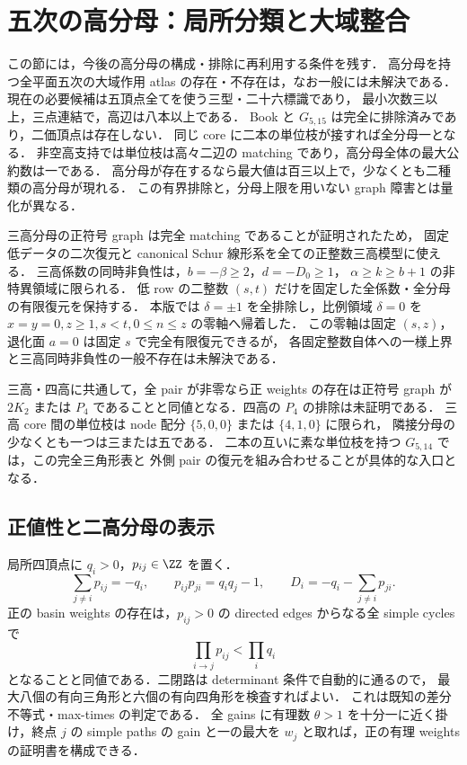 \section{五次の高分母：局所分類と大域整合}
\label{nt19:denominators}

この節には，今後の高分母の構成・排除に再利用する条件を残す．
高分母を持つ全平面五次の大域作用 atlas の存在・不存在は，なお一般には未解決である．
現在の必要候補は五頂点全てを使う三型・二十六標識であり，
最小次数三以上，三点連結で，高辺は八本以上である．
Book と $G_{5,15}$ は完全に排除済みであり，二価頂点は存在しない．
同じ core に二本の単位枝が接すれば全分母一となる．
非空高支持では単位枝は高々二辺の matching であり，高分母全体の最大公約数は一である．
高分母が存在するなら最大値は百三以上で，少なくとも二種類の高分母が現れる．
この有界排除と，分母上限を用いない graph 障害とは量化が異なる．

三高分母の正符号 graph は完全 matching であることが証明されたため，
固定低データの二次復元と canonical Schur 線形系を全ての正整数三高模型に使える．
三高係数の同時非負性は，$b=-\beta\ge2$，$d=-D_0\ge1$，
$\alpha\ge k\ge b+1$ の非特異領域に限られる．
低 row の二整数 $(s,t)$ だけを固定した全係数・全分母の有限復元を保持する．
本版では $\delta=\pm1$ を全排除し，比例領域 $\delta=0$ を
$x=y=0,z\ge1,s<t,0\le n\le z$ の零軸へ帰着した．
この零軸は固定 $(s,z)$，退化面 $a=0$ は固定 $s$ で完全有限復元できるが，
各固定整数自体への一様上界と三高同時非負性の一般不存在は未解決である．

三高・四高に共通して，全 pair が非零なら正 weights の存在は正符号 graph が
$2K_2$ または $P_4$ であることと同値となる．四高の $P_4$ の排除は未証明である．
三高 core 間の単位枝は node 配分 $\{5,0,0\}$ または $\{4,1,0\}$ に限られ，
隣接分母の少なくとも一つは三または五である．
二本の互いに素な単位枝を持つ $G_{5,14}$ では，この完全三角形表と
外側 pair の復元を組み合わせることが具体的な入口となる．

\subsection{正値性と二高分母の表示}

局所四頂点に $q_i>0$，$p_{ij}\in\ZZ$ を置く．
\[
 \sum_{j\ne i}p_{ij}=-q_i,\qquad
 p_{ij}p_{ji}=q_iq_j-1,\qquad
 D_i=-q_i-\sum_{j\ne i}p_{ji}.
\]
正の basin weights の存在は，$p_{ij}>0$ の directed edges からなる全 simple cycles で
\[
 \prod_{i\to j}p_{ij}<\prod_iq_i
\]
となることと同値である．二閉路は determinant 条件で自動的に通るので，
最大八個の有向三角形と六個の有向四角形を検査すればよい．
これは既知の差分不等式・max-times の判定\cite[\S2]{SergeevSchneiderButkovic}である．
全 gains に有理数 $\theta>1$ を十分一に近く掛け，終点 $j$ の simple paths の gain と一の最大を
$w_j$ と取れば，正の有理 weights の証明書を構成できる．

